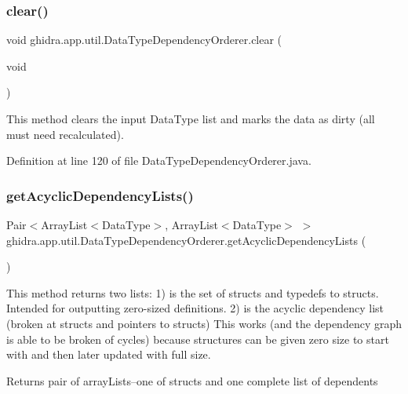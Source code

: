 \subsubsection{\texorpdfstring{clear()}{clear()}}
{\footnotesize\ttfamily void ghidra.\+app.\+util.\+Data\+Type\+Dependency\+Orderer.\+clear (\begin{DoxyParamCaption}\item[{void}]{ }\end{DoxyParamCaption})\hspace{0.3cm}{\ttfamily [inline]}}

This method clears the input Data\+Type list and marks the data as dirty (all must need recalculated). 

Definition at line 120 of file Data\+Type\+Dependency\+Orderer.\+java.

\mbox{\label{classghidra_1_1app_1_1util_1_1_data_type_dependency_orderer_a2dbdd7d069cf6999b722cada66e45a34}} 
\subsubsection{\texorpdfstring{getAcyclicDependencyLists()}{getAcyclicDependencyLists()}}
{\footnotesize\ttfamily Pair$<$Array\+List$<$Data\+Type$>$, Array\+List$<$Data\+Type$>$ $>$ ghidra.\+app.\+util.\+Data\+Type\+Dependency\+Orderer.\+get\+Acyclic\+Dependency\+Lists (\begin{DoxyParamCaption}{ }\end{DoxyParamCaption})\hspace{0.3cm}{\ttfamily [inline]}}

This method returns two lists\+: 1) is the set of structs and typedefs to structs. Intended for outputting zero-\/sized definitions. 2) is the acyclic dependency list (broken at structs and pointers to structs) This works (and the dependency graph is able to be broken of cycles) because structures can be given zero size to start with and then later updated with full size. \begin{DoxyReturn}{Returns}
pair of array\+Lists--one of structs and one complete list of dependents 
\end{DoxyReturn}


